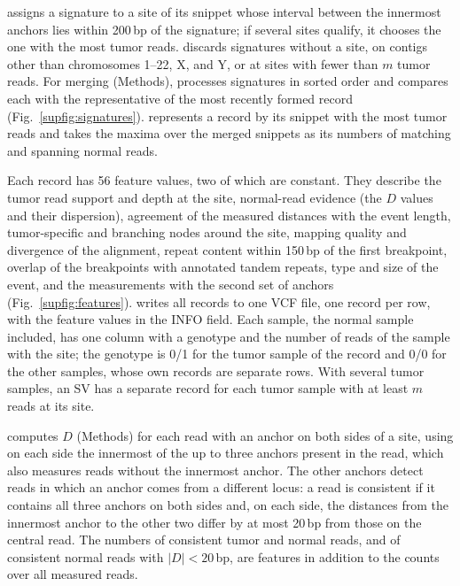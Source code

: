 
\tool{} assigns a signature to a site of its snippet whose interval between the innermost anchors lies within 200\,bp of the signature; if several sites qualify, it chooses the one with the most tumor reads.
\tool{} discards signatures without a site, on contigs other than chromosomes 1--22, X, and Y, or at sites with fewer than $m$ tumor reads.
For merging (Methods), \tool{} processes signatures in sorted order and compares each with the representative of the most recently formed record (Fig.~\ref{supfig:signatures}).
\tool{} represents a record by its snippet with the most tumor reads and takes the maxima over the merged snippets as its numbers of matching and spanning normal reads.

Each record has 56 feature values, two of which are constant.
They describe the tumor read support and depth at the site, normal-read evidence (the $D$ values and their dispersion), agreement of the measured distances with the event length, tumor-specific and branching nodes around the site, mapping quality and divergence of the alignment, repeat content within 150\,bp of the first breakpoint, overlap of the breakpoints with annotated tandem repeats, type and size of the event, and the measurements with the second set of anchors (Fig.~\ref{supfig:features}).
\tool{} writes all records to one VCF file, one record per row, with the feature values in the INFO field.
Each sample, the normal sample included, has one column with a genotype and the number of reads of the sample with the site; the genotype is 0/1 for the tumor sample of the record and 0/0 for the other samples, whose own records are separate rows.
With several tumor samples, an SV has a separate record for each tumor sample with at least $m$ reads at its site.


\tool{} computes $D$ (Methods) for each read with an anchor on both sides of a site, using on each side the innermost of the up to three anchors present in the read, which also measures reads without the innermost anchor.
The other anchors detect reads in which an anchor comes from a different locus: a read is consistent if it contains all three anchors on both sides and, on each side, the distances from the innermost anchor to the other two differ by at most 20\,bp from those on the central read.
The numbers of consistent tumor and normal reads, and of consistent normal reads with $|D|<20$\,bp, are features in addition to the counts over all measured reads.

